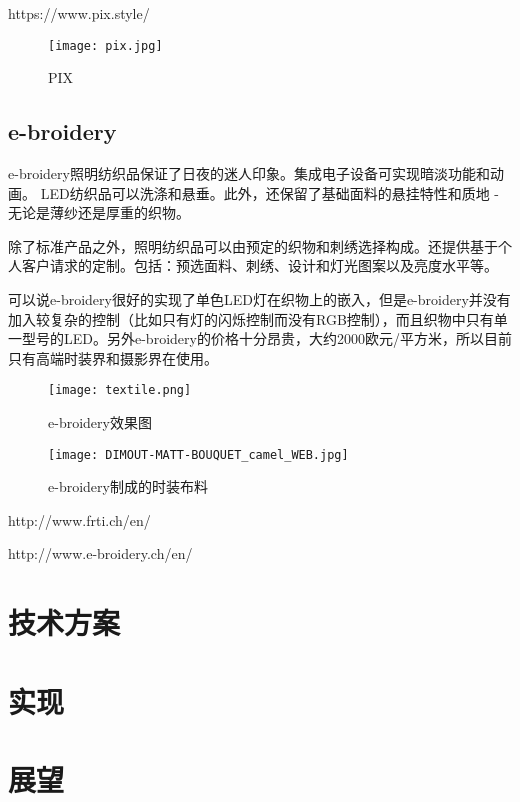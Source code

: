https://www.pix.style/

\begin{figure}[htbp]
\centering
\texttt{[image: pix.jpg]}
\caption{PIX} 
\label{p1}
\end{figure}

\section{e-broidery}

e-broidery照明纺织品保证了日夜的迷人印象。集成电子设备可实现暗淡功能和动画。 LED纺织品可以洗涤和悬垂。此外，还保留了基础面料的悬挂特性和质地 - 无论是薄纱还是厚重的织物。

除了标准产品之外，照明纺织品可以由预定的织物和刺绣选择构成。还提供基于个人客户请求的定制。包括：预选面料、刺绣、设计和灯光图案以及亮度水平等。

可以说e-broidery很好的实现了单色LED灯在织物上的嵌入，但是e-broidery并没有加入较复杂的控制（比如只有灯的闪烁控制而没有RGB控制），而且织物中只有单一型号的LED。另外e-broidery的价格十分昂贵，大约2000欧元/平方米，所以目前只有高端时装界和摄影界在使用。


\begin{figure}[htbp]
\centering
\texttt{[image: textile.png]}
\caption{e-broidery效果图} 
\label{e1}
\end{figure}

\begin{figure}[htbp]
\centering
\texttt{[image: DIMOUT-MATT-BOUQUET\_camel\_WEB.jpg]}
\caption{e-broidery制成的时装布料} 
\label{e2}
\end{figure}

http://www.frti.ch/en/

http://www.e-broidery.ch/en/


\chapter{技术方案}

\chapter{实现}
\chapter{展望}


